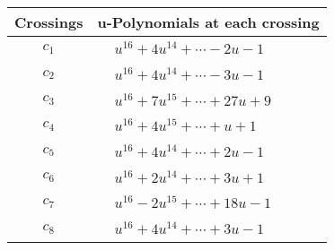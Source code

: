 \documentclass[1p]{elsarticle_modified}
\theoremstyle{definition}
\begin{document}
\begin{tabular}{m{50pt}|m{274pt}}
Crossings & \hspace{64pt}u-Polynomials at each crossing \\
\hline $$\begin{aligned}c_{1}\end{aligned}$$&$\begin{aligned}
&u^{16}+4 u^{14}+\cdots-2 u-1
\end{aligned}$\\
\hline $$\begin{aligned}c_{2}\end{aligned}$$&$\begin{aligned}
&u^{16}+4 u^{14}+\cdots-3 u-1
\end{aligned}$\\
\hline $$\begin{aligned}c_{3}\end{aligned}$$&$\begin{aligned}
&u^{16}+7 u^{15}+\cdots+27 u+9
\end{aligned}$\\
\hline $$\begin{aligned}c_{4}\end{aligned}$$&$\begin{aligned}
&u^{16}+4 u^{15}+\cdots+u+1
\end{aligned}$\\
\hline $$\begin{aligned}c_{5}\end{aligned}$$&$\begin{aligned}
&u^{16}+4 u^{14}+\cdots+2 u-1
\end{aligned}$\\
\hline $$\begin{aligned}c_{6}\end{aligned}$$&$\begin{aligned}
&u^{16}+2 u^{14}+\cdots+3 u+1
\end{aligned}$\\
\hline $$\begin{aligned}c_{7}\end{aligned}$$&$\begin{aligned}
&u^{16}-2 u^{15}+\cdots+18 u-1
\end{aligned}$\\
\hline $$\begin{aligned}c_{8}\end{aligned}$$&$\begin{aligned}
&u^{16}+4 u^{14}+\cdots+3 u-1
\end{aligned}$\\

\end{tabular}
\end{document}
